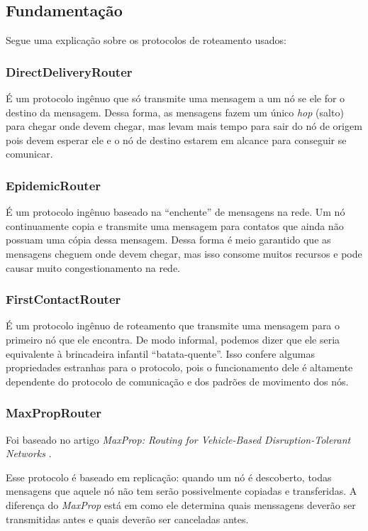 \documentclass[conference]{IEEEtran}
\begin{document}
\subsection{Fundamentação}
Segue uma explicação sobre os protocolos de roteamento usados:

\subsubsection{DirectDeliveryRouter}
É um protocolo ingênuo que só transmite uma mensagem a um nó se ele for o destino da mensagem. Dessa forma, as mensagens fazem um único \textit{hop} (salto) para chegar onde devem chegar, mas levam mais tempo para sair do nó de origem pois devem esperar ele e o nó de destino estarem em alcance para conseguir se comunicar.

\subsubsection{EpidemicRouter}
É um protocolo ingênuo baseado na \textquotedblleft enchente\textquotedblright{} de mensagens na rede. Um nó continuamente copia e transmite uma mensagem para contatos que ainda não possuam uma cópia dessa mensagem.
Dessa forma é meio garantido que as mensagens cheguem onde devem chegar, mas isso consome muitos recursos e pode causar
muito congestionamento na rede.

\subsubsection{FirstContactRouter}
É um protocolo ingênuo de roteamento que transmite uma mensagem para o primeiro nó que ele encontra. De modo informal, podemos dizer que ele seria equivalente à brincadeira infantil \textquotedblleft batata-quente\textquotedblright{}. Isso confere algumas propriedades estranhas para o protocolo, pois o funcionamento dele é altamente dependente do protocolo de comunicação e dos padrões de movimento dos nós.

\subsubsection{MaxPropRouter}
Foi baseado no artigo \textit{MaxProp: Routing for Vehicle-Based Disruption-Tolerant Networks} \cite{MaxPropRouter:original}.
 
Esse protocolo é baseado em replicação: quando um nó é descoberto, todas mensagens que aquele nó não
tem serão possivelmente copiadas e transferidas. A diferença do \emph{MaxProp} está em como ele determina quais
menssagens deverão ser transmitidas antes e quais deverão ser canceladas antes.
\end{document}
